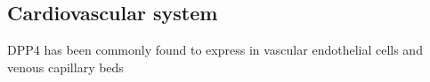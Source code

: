 \subsection{Cardiovascular system}
DPP4 has been commonly found to express in vascular endothelial cells and venous capillary beds~